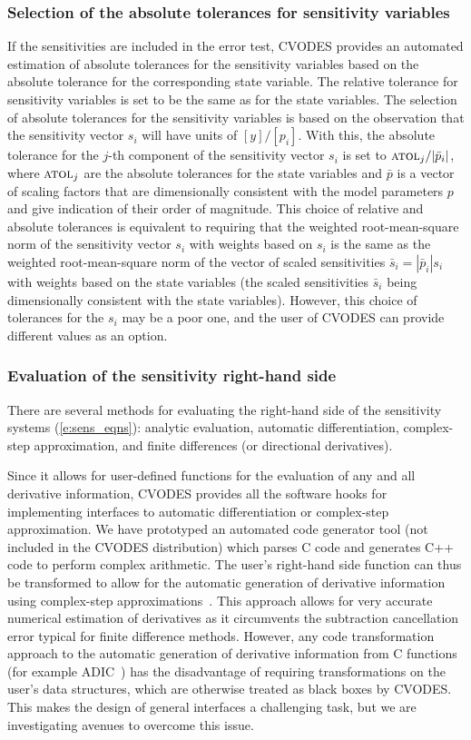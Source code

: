\subsubsection{Selection of the absolute tolerances for sensitivity variables}
If the sensitivities are included in the error test, CVODES provides an 
automated estimation of absolute tolerances for the sensitivity variables 
based on the absolute tolerance for the corresponding state variable.
The relative tolerance for sensitivity variables is set to be the same as for 
the state variables. The selection of absolute tolerances for the sensitivity 
variables is based on the observation that the sensitivity vector $s_i$ will have 
units of $[y]/[p_i]$.
With this, the absolute tolerance for the $j$-th component of the sensitivity
vector $s_i$ is set to ${\mbox{\sc atol}_j}/{|{\bar p}_i|}$,
where $\mbox{\sc atol}_j$ are the absolute tolerances for the state variables and $\bar p$
is a vector of scaling factors that are dimensionally consistent with
the model parameters $p$ and give indication of their order of magnitude.
This choice of relative and absolute tolerances is equivalent 
to requiring that the weighted root-mean-square norm of the sensitivity 
vector $s_i$ with weights based on $s_i$ is the same as the
weighted root-mean-square norm of the vector of scaled sensitivities 
${\bar s}_i = |{\bar p}_i| s_i$ with weights based on the state variables
(the scaled sensitivities ${\bar s}_i$ being dimensionally consistent with the
state variables).
%
However, this choice of tolerances for the $s_i$ may be a poor one, and the user 
of CVODES can provide different values as an option.

\subsubsection{Evaluation of the sensitivity right-hand side}
There are several methods for evaluating the right-hand side of the sensitivity 
systems (\ref{e:sens_eqns}): analytic evaluation, automatic differentiation, 
complex-step approximation, and finite differences (or directional derivatives).

Since it allows for user-defined functions for the evaluation of any and all 
derivative information, CVODES provides all the software hooks for implementing 
interfaces to automatic differentiation or complex-step approximation. 
We have prototyped an automated code generator tool (not included in
the CVODES distribution) which parses C code and generates C++ code to
perform complex arithmetic. The user's right-hand side function can
thus be transformed to allow for the automatic generation of
derivative information using complex-step approximations~\cite{MSA:03}.
This approach allows for very accurate numerical estimation of
derivatives as it circumvents the subtraction cancellation error
typical for finite difference methods. However, any code
transformation approach to the automatic generation of derivative
information from C functions (for example ADIC~\cite{BRM:97})
has the disadvantage of requiring transformations on the user's data
structures, which are otherwise treated as black boxes by CVODES.
This makes the design of general interfaces a challenging task, but we 
are investigating avenues to overcome this issue.

